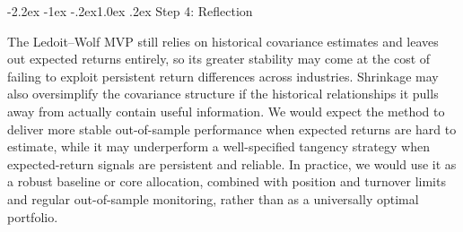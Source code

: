 \documentclass[11pt]{article}
\makeatletter
\renewcommand\subsection{\@startsection{subsection}{2}{0pt}%
  {-2.2ex \@plus -1ex \@minus -.2ex}{1.0ex \@plus .2ex}%
  {\normalfont\bfseries\normalsize\color{psink}}}
\makeatother
\begin{document}
\subsection{Step 4: Reflection}

The Ledoit--Wolf MVP still relies on historical covariance estimates and
leaves out expected returns entirely, so its greater stability may come at
the cost of failing to exploit persistent return differences across
industries. Shrinkage may also oversimplify the covariance structure if the
historical relationships it pulls away from actually contain useful
information. We would expect the method to deliver more stable
out-of-sample performance when expected returns are hard to estimate, while
it may underperform a well-specified tangency strategy when expected-return
signals are persistent and reliable. In practice, we would use it as a robust
baseline or core allocation, combined with position and turnover limits and
regular out-of-sample monitoring, rather than as a universally optimal
portfolio.
\end{document}
